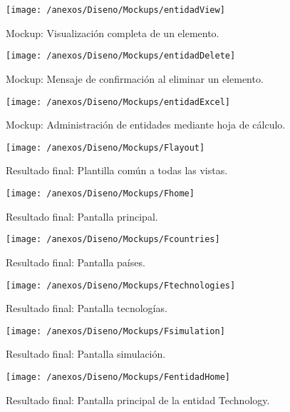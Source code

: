 \begin{figure}[h]
	\centering
	\texttt{[image: /anexos/Diseno/Mockups/entidadView]}
	\caption{Mockup: Visualización completa de un elemento.}
	\label{img:entidadView}
\end{figure}

\begin{figure}[h]
	\centering
	\texttt{[image: /anexos/Diseno/Mockups/entidadDelete]}
	\caption{Mockup: Mensaje de confirmación al eliminar un elemento.}
	\label{img:entidadDelete}
\end{figure}

\begin{figure}[h]
	\centering
	\texttt{[image: /anexos/Diseno/Mockups/entidadExcel]}
	\caption{Mockup: Administración de entidades mediante hoja de cálculo.}
	\label{img:entidadExcel}
\end{figure}


\begin{figure}[h]
	\centering
	\texttt{[image: /anexos/Diseno/Mockups/Flayout]}
	\caption{Resultado final: Plantilla común a todas las vistas.}
	\label{img:Flayout}
\end{figure}

\begin{figure}[h]
	\centering
	\texttt{[image: /anexos/Diseno/Mockups/Fhome]}
	\caption{Resultado final: Pantalla principal.}
	\label{img:Fhome}
\end{figure}

\begin{figure}[h]
	\centering
	\texttt{[image: /anexos/Diseno/Mockups/Fcountries]}
	\caption{Resultado final: Pantalla países.}
	\label{img:Fcountries}
\end{figure}

\begin{figure}[h]
	\centering
	\texttt{[image: /anexos/Diseno/Mockups/Ftechnologies]}
	\caption{Resultado final: Pantalla tecnologías.}
	\label{img:Ftechnologies}
\end{figure}

\begin{figure}[h]
	\centering
	\texttt{[image: /anexos/Diseno/Mockups/Fsimulation]}
	\caption{Resultado final: Pantalla simulación.}
	\label{img:Fsimulation}
\end{figure}

\begin{figure}[h]
	\centering
	\texttt{[image: /anexos/Diseno/Mockups/FentidadHome]}
	\caption{Resultado final: Pantalla principal de la entidad Technology.}
	\label{img:FentidadHome}
\end{figure}

